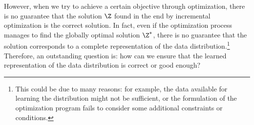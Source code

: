 \documentclass[../../book-main.tex]{subfiles}
\begin{document}

However, when we try to achieve a certain objective through
optimization, there is no guarantee that the solution $\Z$ found
in the end by incremental optimization is the correct solution. In fact, even if
the optimization process manages to find the globally optimal
solution $\Z^*$, there is no guarantee that the solution corresponds
to a complete representation of the data distribution.\footnote{This could be due to many reasons: for example, the data available for learning the distribution might not be sufficient, or the formulation of the optimization program fails to consider some additional constraints or conditions.} Therefore, an outstanding question is: how can we ensure that the learned representation of the data distribution is
correct or good enough? 
\end{document}

